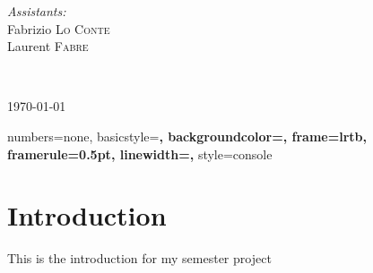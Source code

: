 \begin{titlepage}
\begin{center}
\begin{minipage}{0.4\textwidth}
\begin{flushright}
        \emph{Assistants:} \\
        Fabrizio \textsc{Lo Conte}\\
        Laurent \textsc{Fabre}\\[0.5cm]
      \end{flushright}
    \end{minipage} \\[2cm]
     
    \vfill
     
    {\large \today}
     
  \end{center}

\end{titlepage}

\newpage{}

\fancyfoot{}
\lhead{}
\cfoot{\thepage}        %
\rfoot{\today} %



\tableofcontents{}

\newpage

\lstset{language=C}


{
  numbers=none,
  basicstyle=\bf\ttfamily,
  backgroundcolor=\color{grey92},
  frame=lrtb,
  framerule=0.5pt,
  linewidth=\textwidth,
}
{
  style=console
}

\lstset{
  style=console
}



\section*{Introduction}
This is the introduction for my semester project

